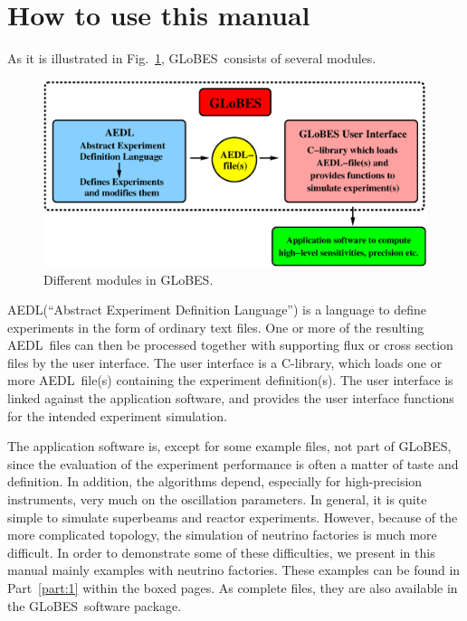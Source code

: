 \documentclass[a4paper,12pt,twoside]{book}
\newcommand{\fig}{Fig.}
\newcommand{\Part}{Part}
\newcommand{\GLOBES}{{\sf GLoBES}}
\newcommand{\AEDL}{{\sf AEDL}}
\newcommand{\figu}[1]{\fig~\ref{fig:#1}}
\begin{document}
\cleardoublepage
\tableofcontents

\cleardoublepage
\setcounter{page}{1}

\chapter*{How to use this manual}

As it is illustrated in \figu{GLOBES}, \GLOBES\ consists 
of several modules.

\begin{figure}[bht]
\begin{center}
\includegraphics[width=16cm]{GLOBES}
\end{center}
\caption{\label{fig:GLOBES} Different modules in \GLOBES .}
\end{figure}
%
\AEDL (``Abstract Experiment Definition Language'') is a language
to define experiments in the form of ordinary text files. One or more of 
the resulting \AEDL\ files can then be processed together with supporting 
flux or cross section files by the user interface. The user interface
is a C-library, which loads one or more \AEDL\ file(s)
containing the experiment definition(s). The user interface is linked 
against the application software, and provides the user interface functions
for the intended experiment simulation. 

The application 
software is, except for some example files, not part of \GLOBES , since
the evaluation of the experiment performance is often a matter of taste
and definition. In addition, the algorithms depend, especially for
high-precision instruments, very much on the oscillation parameters.
In general, it is quite simple to simulate superbeams and reactor
experiments. However, because of the more complicated topology, the
simulation of neutrino factories is much more difficult. In order
to demonstrate some of these difficulties, we present in this manual mainly
examples with neutrino factories. These examples can be found in
\Part~\ref{part:1} within the boxed pages. As complete files, they
are also available in the \GLOBES\ software package.
\end{document}
